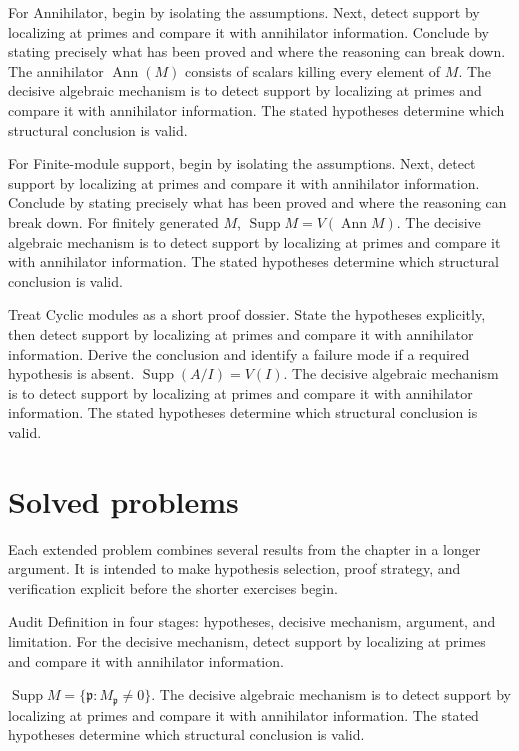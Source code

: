 \begin{example}\label{ex:v16-worked-02}
For Annihilator, begin by isolating the assumptions. Next, detect support by localizing at primes and compare it with annihilator information. Conclude by stating precisely what has been proved and where the reasoning can break down. The annihilator $\operatorname{Ann}(M)$ consists of scalars killing every element of $M$. The decisive algebraic mechanism is to detect support by localizing at primes and compare it with annihilator information. The stated hypotheses determine which structural conclusion is valid.
\end{example}

\begin{example}\label{ex:v16-worked-03}
For Finite-module support, begin by isolating the assumptions. Next, detect support by localizing at primes and compare it with annihilator information. Conclude by stating precisely what has been proved and where the reasoning can break down. For finitely generated $M$, $\operatorname{Supp}M=V(\operatorname{Ann}M)$. The decisive algebraic mechanism is to detect support by localizing at primes and compare it with annihilator information. The stated hypotheses determine which structural conclusion is valid.
\end{example}

\begin{example}\label{ex:v16-worked-04}
Treat Cyclic modules as a short proof dossier. State the hypotheses explicitly, then detect support by localizing at primes and compare it with annihilator information. Derive the conclusion and identify a failure mode if a required hypothesis is absent. $\operatorname{Supp}(A/I)=V(I)$. The decisive algebraic mechanism is to detect support by localizing at primes and compare it with annihilator information. The stated hypotheses determine which structural conclusion is valid.
\end{example}

\section{Solved problems}
Each extended problem combines several results from the chapter in a longer argument. It is intended to make hypothesis selection, proof strategy, and verification explicit before the shorter exercises begin.

\begin{problem}\label{prob:v16-problem-01}
Audit Definition in four stages: hypotheses, decisive mechanism, argument, and limitation. For the decisive mechanism, detect support by localizing at primes and compare it with annihilator information.
\end{problem}
\begin{solution}
$\operatorname{Supp}M=\{\mathfrak p:M_{\mathfrak p}\ne0\}$. The decisive algebraic mechanism is to detect support by localizing at primes and compare it with annihilator information. The stated hypotheses determine which structural conclusion is valid.
\end{solution}


